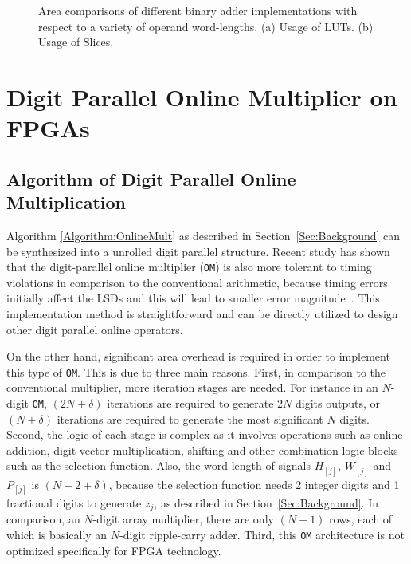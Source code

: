 \documentclass[conference]{IEEEtran}
\begin{document}
\begin{figure}[tbp]
{\begin{minipage}{0.45\textwidth}
    \vspace{1ex}
  \end{minipage}
  }
  \caption{Area comparisons of different binary adder implementations with respect to a variety of operand word-lengths. (a) Usage of LUTs. (b) Usage of Slices.}
  \label{Fig:AdderArea}
  \vspace{-1ex}
\end{figure}






\section{Digit Parallel Online Multiplier on FPGAs}\label{Sec:OM_FPGA}
\subsection{Algorithm of Digit Parallel Online Multiplication}
Algorithm \ref{Algorithm:OnlineMult} as described in Section~\ref{Sec:Background} can be synthesized into a unrolled digit parallel structure. Recent study has shown that the digit-parallel online multiplier (\texttt{OM}) is also more tolerant to timing violations in comparison to the conventional arithmetic, because timing errors initially affect the LSDs and this will lead to smaller error magnitude~\cite{SKDAC14}. This implementation method is straightforward and can be directly utilized to design other digit parallel online operators.

On the other hand, significant area overhead is required in order to implement this type of \texttt{OM}. This is due to three main reasons. First, in comparison to the conventional multiplier, more iteration stages are needed. For instance in an $N$-digit \texttt{OM}, $(2N+\delta)$ iterations are required to generate $2N$ digits outputs, or $(N+\delta)$ iterations are required to generate the most significant $N$ digits. Second, the logic of each stage is complex as it involves operations such as online addition, digit-vector multiplication, shifting and other combination logic blocks such as the selection function. Also, the word-length of signals $H_{[j]}$, $W_{[j]}$ and $P_{[j]}$ is $(N+2+\delta)$, because the selection function needs 2 integer digits and 1 fractional digits to generate $z_j$, as described in Section~\ref{Sec:Background}. In comparison, an $N$-digit array multiplier, there are only $(N-1)$ rows, each of which is basically an $N$-digit ripple-carry adder. Third, this \texttt{OM} architecture is not optimized specifically for FPGA technology.
\end{document}
